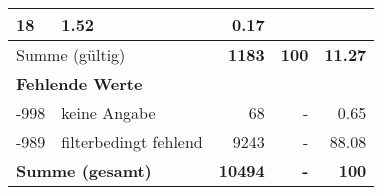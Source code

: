 \begin{longtable}{lXrrr}
       \num{18} &
       \num[round-mode=places,round-precision=2]{1,52} &
         \num[round-mode=places,round-precision=2]{0,17} \\
     \midrule
     \multicolumn{2}{l}{Summe (gültig)} &
       \textbf{\num{1183}} &
     \textbf{100} &
       \textbf{\num[round-mode=places,round-precision=2]{11,27}} \\
     \multicolumn{5}{l}{\textbf{Fehlende Werte}}\\
       -998 &
       keine Angabe &
         \num{68} &
        - &
         \num[round-mode=places,round-precision=2]{0,65} \\
       -989 &
       filterbedingt fehlend &
         \num{9243} &
        - &
         \num[round-mode=places,round-precision=2]{88,08} \\
     \midrule
     \multicolumn{2}{l}{\textbf{Summe (gesamt)}} &
          \textbf{\num{10494}} &
        \textbf{-} &
        \textbf{100} \\
     \bottomrule
     \end{longtable}
     
